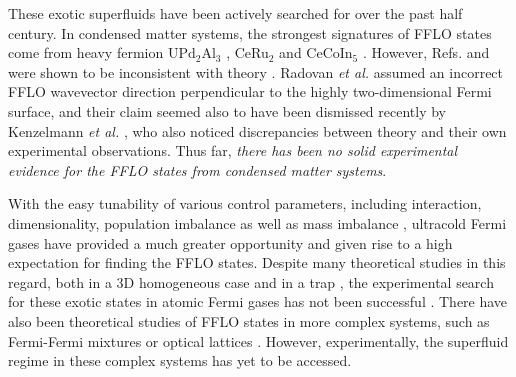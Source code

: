 \documentclass[aps,twocolumn,prl,tightenlines,floatfix]{revtex4-1}
\begin{document}
These exotic superfluids have been actively searched for over the past
half century. 
%
In condensed matter systems, the strongest signatures of FFLO states
come from heavy fermion UPd$_2$Al$_3$ \cite{Gloos}, CeRu$_2$
\cite{Huxley} and CeCoIn$_5$ \cite{Radovan,Kenzelmann}. However,
Refs. \cite{Gloos} and \cite{Huxley} were shown to be inconsistent
with theory \cite{NormanFFLOcomment,Tenya}. Radovan \textit{et al.}
\cite{Radovan} assumed an incorrect FFLO wavevector direction
perpendicular to the highly two-dimensional Fermi surface, and their
claim seemed also to have been dismissed recently by Kenzelmann
\textit{et al.}  \cite{Kenzelmann}, who also noticed discrepancies
between theory and their own experimental observations. Thus far,
\emph{there has been no solid experimental evidence for the FFLO states
from condensed matter systems}.


With the easy tunability of various control parameters, including
interaction, dimensionality, population imbalance as well as mass
imbalance \cite{Review,Bloch_RMP}, ultracold Fermi gases have provided
a much greater opportunity and given rise to a high expectation for
finding the FFLO states.
%
Despite many theoretical studies in this regard, both in a 3D
homogeneous case
\cite{LOFF1,SR06,huhui06pra,helianyi06prb,CombescotPRB7114,*Yip07pra,FFLO_MF_us}
and in a trap \cite{Machida2,zw07pra,Kinnunen}, the experimental
search for these exotic states in atomic Fermi gases has not been
successful \cite{ZSSK06,Rice1}.
%
There have also been theoretical studies of FFLO states in more
complex systems, such as Fermi-Fermi mixtures
\cite{Stoof09prl,*Stoof10pra,Stoof12pra,FFLO_MF_us}
or optical lattices
\cite{WuCJPRA83,*Buchleitner2012,*Mendoza2013,*Koga2012,*Torma2012,*ChenAHai2012}.
%
However, experimentally, the superfluid regime in these complex
systems has yet to be accessed.


\end{document}
